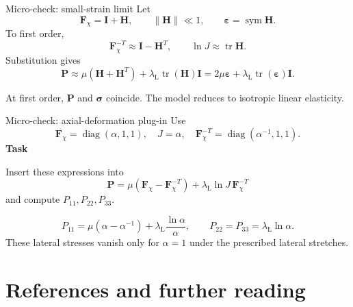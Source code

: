 \documentclass[aspectratio=169,11pt]{beamer}
\newcommand{\I}{\bm{I}}
\newcommand{\Fdef}{\bm{F}_{\chi}}
\newcommand{\sigmaC}{\bm{\sigma}}
\newcommand{\Pten}{\bm{P}}
\begin{document}
\begin{frame}{Micro-check: small-strain limit}
Let
\[
  \Fdef=\I+\bm{H},
  \qquad
  \lVert\bm{H}\rVert\ll1,
  \qquad
  \bm{\varepsilon}=\operatorname{sym}\bm{H}.
\]
To first order,
\[
  \Fdef^{-T}\approx\I-\bm{H}^T,
  \qquad
  \ln J\approx\operatorname{tr}\bm{H}.
\]
Substitution gives
\[
  \Pten
  \approx
  \mu(\bm{H}+\bm{H}^T)
  +\lambda_{\mathrm L}\operatorname{tr}(\bm{H})\I
  =
  \boxed{
  2\mu\bm{\varepsilon}
  +\lambda_{\mathrm L}
  \operatorname{tr}(\bm{\varepsilon})\I
  }.
\]
\begin{punchbox}
\small
At first order, \(\Pten\) and \(\sigmaC\) coincide. The model reduces to isotropic linear elasticity.
\end{punchbox}
\end{frame}

\begin{frame}{Micro-check: axial-deformation plug-in}
Use
\[
  \Fdef=\operatorname{diag}(\alpha,1,1),
  \quad
  J=\alpha,
  \quad
  \Fdef^{-T}
  =\operatorname{diag}(\alpha^{-1},1,1).
\]
\textbf{Task}

Insert these expressions into
\[
  \Pten
  =
  \mu(\Fdef-\Fdef^{-T})
  +\lambda_{\mathrm L}\ln J\,\Fdef^{-T}
\]
and compute \(P_{11},P_{22},P_{33}\).
\medskip
\begin{punchbox}
\small
\[
  P_{11}
  =
  \mu(\alpha-\alpha^{-1})
  +\lambda_{\mathrm L}\frac{\ln\alpha}{\alpha},
  \qquad
  P_{22}=P_{33}=\lambda_{\mathrm L}\ln\alpha.
\]
These lateral stresses vanish only for \(\alpha=1\) under the prescribed lateral stretches.
\end{punchbox}
\end{frame}

\section{References and further reading}
\end{document}
